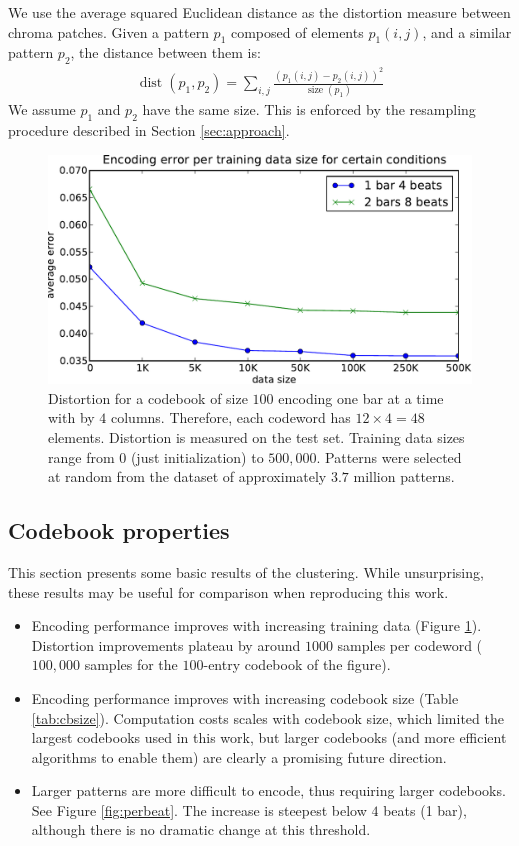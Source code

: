 \documentclass{article}
\DeclareMathOperator*{\dist}{dist}
\DeclareMathOperator*{\size}{size}
\begin{document}
We use the average squared Euclidean distance as the distortion
measure between chroma patches.  Given a pattern $p_1$
composed of elements $p_1(i,j)$, and a similar pattern $p_2$, the
distance between them is:
\begin{eqnarray}
  \dist(p_1,p_2) = \sum_{i,j} \frac{\left(p_1(i,j) - p_2(i,j)\right)^2}{\size(p_1)}
  \label{eq:dist}
\end{eqnarray}
We assume $p_1$ and $p_2$ have the same size.  This is enforced by the
resampling procedure described in Section \ref{sec:approach}.

\begin{figure}[t]
\begin{center}
\includegraphics[width=.8\columnwidth]{data_sizes}
\end{center}
\caption{\small{Distortion for a codebook of size $100$ encoding one bar
at a time with by $4$ columns.
Therefore, each codeword has $12 \times 4 = 48$ elements.
Distortion is measured on the test set.  Training data sizes range
from $0$ (just initialization) to $500,000$. Patterns were selected at
random from the dataset of approximately $3.7$ million patterns.
}}
\label{fig:data_sizes}
\end{figure}




\subsection{Codebook properties}
This section presents some basic results of the clustering.
While unsurprising, these results may be useful for comparison 
when reproducing this work.
\begin{itemize}
\item Encoding performance improves with increasing training data (Figure
\ref{fig:data_sizes}). Distortion improvements plateau by around $1000$ samples 
per codeword ($100,000$ samples for the $100$-entry codebook of the figure).
\item Encoding performance improves with increasing codebook size
(Table \ref{tab:cbsize}).  Computation costs scales with codebook size, 
which limited the largest codebooks used in this work, but larger codebooks 
(and more efficient algorithms to enable them) are clearly a promising future 
direction.
\item Larger patterns are more difficult to encode, thus requiring
larger codebooks. See Figure \ref{fig:perbeat}. The increase is steepest
below $4$ beats (1 bar), although there is no dramatic change at 
this threshold.
\end{itemize}
\end{document}
